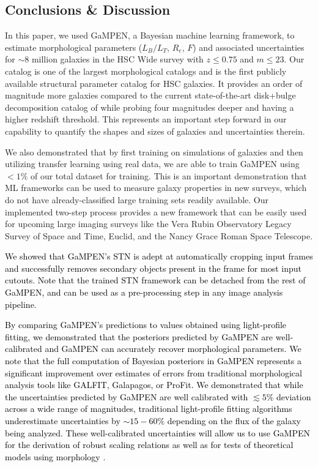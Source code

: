 \documentclass[linenumbers,twocolumn,twocolappendix]{aastex631}
\newcommand\gampen{GaMPEN}
\begin{document}
\begin{CJK*}{UTF8}{gbsn}
\section{Conclusions \& Discussion} \label{sec:conclusions}
In this paper, we used \gampen{}, a Bayesian machine learning framework, to estimate morphological parameters ($L_B/L_T$, $R_e$, $F$) and associated uncertainties for $\sim8$ million galaxies in the HSC Wide survey with $z \leq 0.75$ and $m \leq 23$. Our catalog is one of the largest morphological catalogs and is the first publicly available structural parameter catalog for HSC galaxies. It provides an order of magnitude more galaxies compared to the current state-of-the-art disk+bulge decomposition catalog of \citet{simard_11} while probing four magnitudes deeper and having a higher redshift threshold. This represents an important step forward in our capability to quantify the shapes and sizes of galaxies and uncertainties therein.

We also demonstrated that by first training on simulations of galaxies and then utilizing transfer learning using real data, we are able to train \gampen{} using $<1\%$ of our total dataset for training. This is an important demonstration that ML frameworks can be used to measure galaxy properties in new surveys, which do not have already-classified large training sets readily available. Our implemented two-step process provides a new framework that can be easily used for upcoming large imaging surveys like the Vera Rubin Observatory Legacy Survey of Space and Time, Euclid, and the Nancy Grace Roman Space Telescope. 

\textcolor{black}{We showed that \gampen{}'s STN is adept at automatically cropping input frames and successfully removes secondary objects present in the frame for most input cutouts. Note that the trained STN framework can be detached from the rest of \gampen{}, and can be used as a pre-processing step in any image analysis pipeline.}

\textcolor{black}{By comparing \gampen{}'s predictions to values obtained using light-profile fitting, we demonstrated that the posteriors predicted by \gampen{} are well-calibrated and \gampen{} can accurately recover morphological parameters. We note that the full computation of Bayesian posteriors in \gampen{} represents a significant improvement over estimates of errors from traditional morphological analysis tools like GALFIT, Galapagos, or ProFit. We demonstrated that while the uncertainties predicted by \gampen{} are well calibrated with $\lesssim5\%$ deviation across a wide range of magnitudes, traditional light-profile fitting algorithms underestimate uncertainties by $\sim15-60\%$ depending on the flux of the galaxy being analyzed. These well-calibrated uncertainties will allow us to use \gampen{} for the derivation of robust scaling relations  \citep[e.g.,][]{Bernardi2013TheProfile, vanderWel20143D-HST+CANDELS:3} as well as for tests of theoretical models using morphology \citep[e.g.,][]{Schawinski2014TheGalaxies}.}



\end{CJK*}
\end{document}
